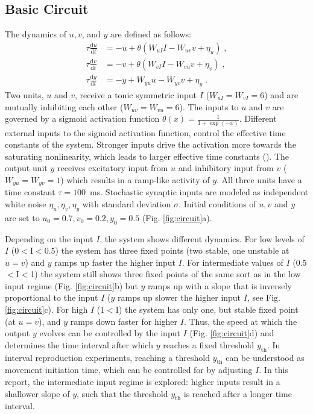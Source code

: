 \documentclass[10pt]{article}
\begin{document}
\subsection{Basic Circuit}
The dynamics of $u, v$, and $y$ are defined as follows:
\begin{equation} \label{circuit}
	\begin{split}
	\tau\frac{\text{d}u}{\text{d}t} & = -u + \theta(W_{uI}I - W_{uv}v + \eta_u) \;, \\
	\tau\frac{\text{d}v}{\text{d}t} & = -v + \theta(W_{vI}I - W_{vu}v + \eta_v) \;, \\
	\tau\frac{\text{d}y}{\text{d}t} & = -y + W_{yu}u - W_{yv}v + \eta_y \;.
	\end{split}
\end{equation}
Two units, $u$ and $v$, receive a tonic symmetric input $I$ ($W_{uI}=W_{vI}=6$) and are mutually inhibiting each other ($W_{uv}=W_{vu}=6$). 
The inputs to $u$ and $v$ are governed by a sigmoid activation function $\theta(x) = \frac{1}{1+\exp(-x)}$.
Different external inputs to the sigmoid activation function, control the effective time constants of the system. Stronger inputs drive the activation more towards the saturating nonlinearity, which leads to larger effective time constants (\cite{Egger2020}). 
The output unit $y$ receives excitatory input from $u$ and inhibitory input from $v$ ($W_{yu}=W_{yv}=1$) which results in a ramp-like activity of $y$.
All three units have a time constant $\tau = 100$~ms. 
Stochastic synaptic inputs are modeled as independent white noise $\eta_u, \eta_v, \eta_y$ with standard deviation $\sigma$.
Initial conditions of $u, v$ and $y$ are set to $u_0=0.7, v_0=0.2, y_0=0.5$ (Fig. \ref{fig:circuit}a). %

Depending on the input $I$, the system shows different dynamics. For low levels of $I$ (0$<$I$<$0.5) the system has three fixed points (two stable, one unstable at $u=v$) and $y$ ramps up faster the higher input $I$. 
For intermediate values of $I$ (0.5$<$I$<$1) the system still shows three fixed points of the same sort as in the low input regime (Fig. \ref{fig:circuit}b) but $y$ ramps up with a slope that is inversely proportional to the input $I$ ($y$ ramps up slower the higher input $I$, see Fig. \ref{fig:circuit}c). 
For high $I$ (1$<$I) the system has only one, but stable fixed point (at $u=v$), and $y$ ramps down faster for higher $I$.
Thus, the speed at which the output $y$ evolves can be controlled by the input $I$ (Fig. \ref{fig:circuit}d) and determines the time interval after which $y$ reaches a fixed threshold $y_{\text{th}}$. 
In interval reproduction experiments, reaching a threshold $y_{\text{th}}$ can be understood as movement initiation time, which can be controlled for by adjusting $I$.
In this report, the intermediate input regime is explored: higher inputs result in a shallower slope of $y$, such that the threshold $y_{\text{th}}$ is reached after a longer time interval.
\end{document}
